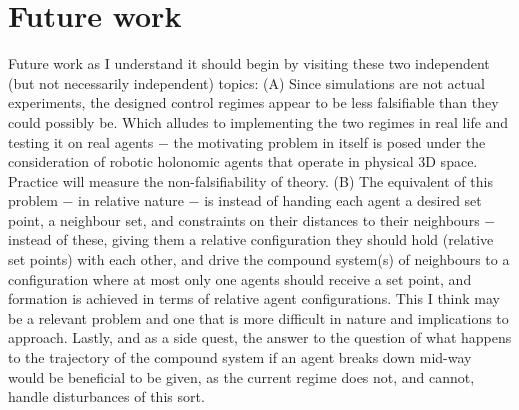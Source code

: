 \chapter{Future work}

Future work as I understand it should begin by visiting these two independent
(but not necessarily independent) topics:
(A) Since simulations are not actual experiments, the designed control regimes
appear to be less falsifiable than they could possibly be. Which alludes to
implementing the two regimes in real life and testing it on real agents $-$ the
motivating problem in itself is posed under the consideration of robotic
holonomic agents that operate in physical 3D space. Practice will measure the
non-falsifiability of theory.
(B) The equivalent of this problem $-$ in relative nature $-$ is instead of
handing each agent a desired set point, a neighbour set, and constraints on
their distances to their neighbours $-$ instead of these, giving them a
relative configuration they should hold (relative set points) with each other,
and drive the compound system(s) of neighbours to a configuration where at most
only one agents should receive a set point, and formation is achieved in
terms of relative agent configurations. This I think may be a relevant problem
and one that is more difficult in nature and implications to approach. Lastly,
and as a side quest, the answer to the question of what happens to the
trajectory of the compound system if an agent breaks down mid-way would be
beneficial to be given, as the current regime does not, and cannot, handle
disturbances of this sort.
